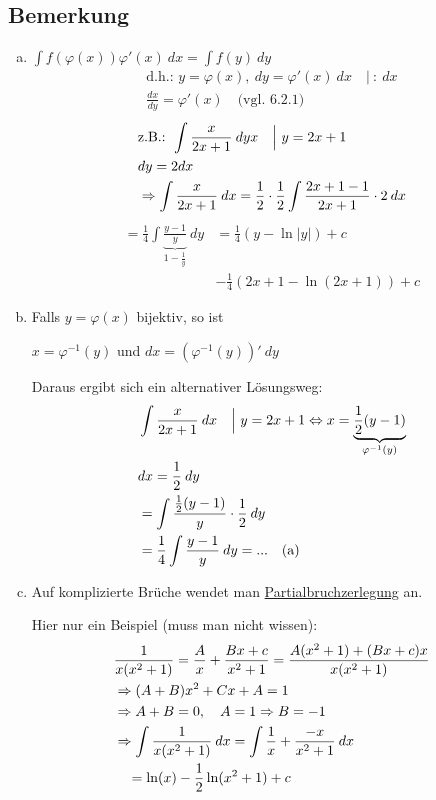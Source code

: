 \documentclass[10pt, a4paper, fleqn]{article}
\begin{document}
\subsection{Bemerkung}
\begin{enumerate}[a)]
    \item $\displaystyle \int f(\varphi(x)) \varphi'(x) \:dx = \int f(y) \:dy$
    \[\begin{aligned}
        \text{d.h.: } y = \varphi(x), \:dy = \varphi'(x) \:dx \quad \Big| \ : \:dx \\
        \frac{dx}{dy} = \varphi'(x) \quad \text{(vgl. 6.2.1)}
    \end{aligned}\]
    \[\begin{aligned}
        &\text{z.B.: } \int \frac{x}{2x + 1} \:dyx \quad \Big| \ y = 2x + 1 \\
        &dy = 2dx \\
        &\Rightarrow \int \frac{x}{2x + 1} \:dx = \frac{1}{2} \cdot \frac{1}{2} \int \frac{2x + 1 - 1}{2x + 1} \cdot 2 \:dx
    \end{aligned}\]
    \[\begin{aligned}
        = \frac{1}{4} \int \underbrace{\frac{y - 1}{y}}_{1 - \frac{1}{y}} \:dy &= \frac{1}{4}(y - \ln|y|) + c \\
        &-\frac{1}{4}(2x + 1 - \ln (2x + 1)) + c
    \end{aligned}\]

    \item Falls $y = \varphi(x)$ bijektiv, so ist

    $x = \varphi^{-1}(y)$ und $dx = (\varphi^{-1}(y))' \:dy$

    Daraus ergibt sich ein alternativer Lösungsweg:
    \[\begin{aligned}
        &\int \frac{x}{2x + 1} \:dx \quad \Big| \ y = 2x + 1 \Leftrightarrow x = \underbrace{\frac{1}{2}(y - 1)}_{\varphi^{-1}(y)} \\
        &dx = \frac{1}{2} \:dy \\
        &=\int \frac{\frac{1}{2}(y - 1)}{y} \cdot \frac{1}{2} \:dy \\
        &=\frac{1}{4} \int \frac{y - 1}{y} \:dy = ... \quad \text{(a)}
    \end{aligned}\]

    \item Auf komplizierte Brüche wendet man \underline{Partialbruchzerlegung} an.

    Hier nur ein Beispiel (muss man nicht wissen):
    \[\begin{aligned}
        &\frac{1}{x(x^2 + 1)} = \frac{A}{x} + \frac{Bx + c}{x^2 + 1} = \frac{A(x^2 + 1) + (Bx + c)x}{x(x^2 + 1)} \\
        &\Rightarrow (A + B)x^2 + Cx + A = 1 \\
        &\Rightarrow A + B = 0, \quad A = 1 \Rightarrow B = -1 \\
        &\Rightarrow \int \frac{1}{x(x^2 + 1)} \:dx = \int \frac{1}{x} + \frac{-x}{x^2 + 1} \:dx \\
        &\quad = \ln(x) - \frac{1}{2} \ln(x^2 + 1) + c
    \end{aligned}\]
\end{enumerate}
\end{document}
